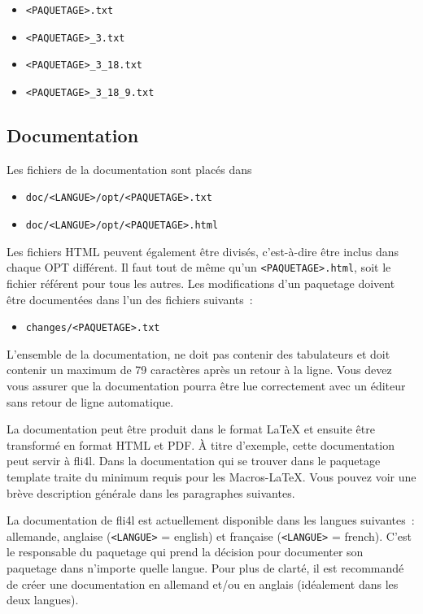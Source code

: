 \begin{itemize}
\item \texttt{<PAQUETAGE>.txt}
\item \texttt{<PAQUETAGE>\_3.txt}
\item \texttt{<PAQUETAGE>\_3\_18.txt}
\item \texttt{<PAQUETAGE>\_3\_18\_9.txt}
\end{itemize}


\subsection{Documentation}

    Les fichiers de la documentation sont placés dans

    \begin{itemize}
    \item \texttt{doc/<LANGUE>/opt/<PAQUETAGE>.txt}
    \item \texttt{doc/<LANGUE>/opt/<PAQUETAGE>.html}
    \end{itemize}

    Les fichiers HTML peuvent également être divisés, c'est-à-dire être inclus
    dans chaque OPT différent. Il faut tout de même qu'un \texttt{<PAQUETAGE>.html},
    soit le fichier référent pour tous les autres. Les
    modifications d'un paquetage doivent être documentées dans l'un des fichiers
    suivants~:

    \begin{itemize}
    \item \texttt{changes/<PAQUETAGE>.txt}
    \end{itemize}

    L'ensemble de la documentation, ne doit pas contenir des tabulateurs et doit
    contenir un maximum de 79 caractères après un retour à la ligne. Vous devez
    vous assurer que la documentation pourra être lue correctement avec
    un éditeur sans retour de ligne automatique.

    La documentation peut être produit dans le format \LaTeX{} et ensuite être
    transformé en format HTML et PDF. À titre d'exemple,
    cette documentation peut servir à fli4l. Dans la documentation qui se
    trouver dans le paquetage \og{}template\fg{} traite du minimum requis pour les
    Macros-\LaTeX. Vous pouvez voir une brève description générale dans
    les paragraphes suivantes.

    La documentation de fli4l est actuellement disponible dans les langues suivantes~:
	allemande, anglaise (\texttt{<LANGUE>} = \og{}english\fg{}) et française
	(\texttt{<LANGUE>} = \og{}french\fg{}). C'est le responsable du paquetage qui prend
	la décision pour documenter son paquetage dans n'importe quelle langue. Pour plus
	de clarté, il est recommandé de créer une documentation en allemand et/ou en anglais
	(idéalement dans les deux langues).


